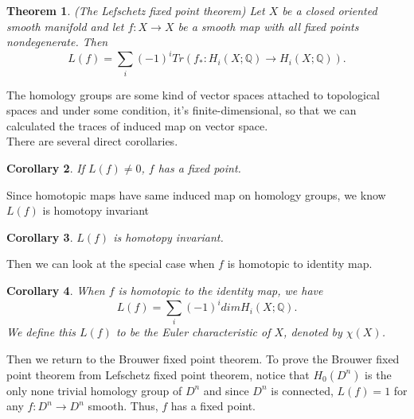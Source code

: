 \documentclass[psamsfonts]{amsart}
\newtheorem{theorem}{Theorem}[section]
\newtheorem{cor}[theorem]{Corollary}
\theoremstyle{definition}
\theoremstyle{remark}
\numberwithin{equation}{section}
\begin{document}
		\begin{theorem}(The Lefschetz fixed point theorem)
			Let $X$ be a closed oriented smooth manifold and let $f: X \to X$ be a smooth map with all fixed points nondegenerate. Then
			\begin{equation}
				L(f) = \sum_{i} (-1)^i Tr(f_*: H_i(X;\mathbb{Q}) \to H_i(X;\mathbb{Q})).
			\end{equation}
		\end{theorem}
		\indent The homology groups are some kind of vector spaces attached to topological spaces and under some condition, it's finite-dimensional, so that we can calculated the traces of induced map on vector space.\\
		There are several direct corollaries.
		\begin{cor}
			If $L(f) \neq 0$, $f$ has a fixed point.
		\end{cor}
		Since homotopic maps have same induced map on homology groups, we know $L(f)$ is homotopy invariant
		\begin{cor}
			$L(f)$ is homotopy invariant.
		\end{cor}
		Then we can look at the special case when $f$ is homotopic to identity map.
		\begin{cor}
			When $f$ is homotopic to the identity map, we have 
			\begin{equation}
				L(f) = \sum_i (-1)^i dim H_i(X;\mathbb{Q}).
			\end{equation}
			We define this $L(f)$ to be the Euler characteristic of $X$, denoted by $\chi (X)$.
		\end{cor}
		Then we return to the Brouwer fixed point theorem. To prove the Brouwer fixed point theorem from Lefschetz fixed point theorem, notice that $H_0(D^n)$ is the only none trivial homology group of $D^n$ and since $D^n$ is connected, $L(f) = 1$ for any $f: D^n \to D^n$ smooth. Thus, $f$ has a fixed point.\\
		
\end{document}
